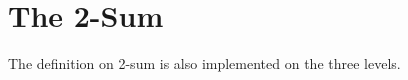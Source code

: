 \section{The 2-Sum}

\begin{comment}
Consider standard representation matrices $B_{\ell}$ of type $\mathbb{Z}_{2}^{X_{\ell} \times Y_{\ell}}$
and $B_{r}$ of type $\mathbb{Z}_{2}^{X_{r} \times Y_{r}}$ where
$X_{\ell} \cap X_{r} = \{x\}$ for some element $x$,
$Y_{\ell} \cap Y_{r} = \{y\}$ for some element $y$,
and all other pairs of sets are disjoint.
If we have
\[
    B_{\ell} = \begin{NiceArray}{cc}[hvlines,right-margin=0.5em,left-margin=0.1em]
        \Block[draw]{2-2}{A_{\ell}} & \phantom{1} \\
        \phantom{1} & \phantom{1} \\
        \Block[draw]{1-2}{r} & \\
    \end{NiceArray}
    , \quad
    B_{r} = \begin{NiceArray}{ccc}[hvlines,right-margin=0.5em,left-margin=0.1em]
        \Block[draw]{2-1}{c} & \Block[draw]{2-2}{A_{r}} & \phantom{1} \\
        & \phantom{1} & \phantom{1} \\
    \end{NiceArray}
\]
where $r \ne 0$ and $c \ne 0$, then their 2-sum is
\[
    B = \begin{NiceArray}{cccc}[hvlines,right-margin=0.5em,left-margin=0.1em]
        \Block[draw]{2-2}{A_{\ell}} & \phantom{1} & \Block[draw]{2-2}{0} & \phantom{1} \\
        \phantom{1} & \phantom{1} & \phantom{1} & \phantom{1} \\
        \Block[draw]{2-2}{c \otimes r} & \phantom{1} & \Block[draw]{2-2}{A_{r}} & \phantom{1} \\
        \phantom{1} & \phantom{1} & \phantom{1} & \phantom{1} \\
    \end{NiceArray}
\]
where $\otimes$ denotes the outer product of vectors.
\end{comment}

The definition on 2-sum is also implemented on the three levels.


